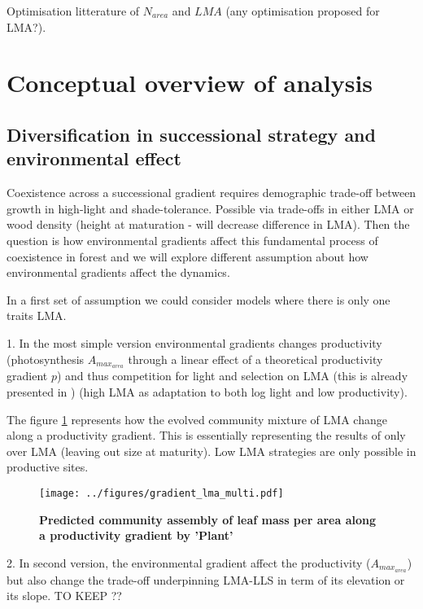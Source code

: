 \documentclass[a4paper,11pt]{article}
\begin{document}
Optimisation litterature of $N_{area}$ and $LMA$ (any optimisation proposed for LMA?).



\section{Conceptual overview of analysis}

\subsection{Diversification in successional strategy and environmental effect}

Coexistence across a successional gradient requires demographic trade-off between growth in high-light and shade-tolerance. Possible via trade-offs in either LMA or wood density (height at maturation - will decrease difference in LMA). Then the question is how environmental gradients affect this fundamental process of coexistence in forest and we will explore different assumption about how environmental gradients
affect the dynamics.

In a first set of assumption we could consider models where there is only one traits LMA.

\clearpage

1. In the most simple version environmental gradients changes productivity (photosynthesis $A_{max}_{area}$ through a linear effect of a theoretical productivity gradient $p$) and
thus competition for light and selection on LMA (this is already presented in \citet{Falster-2017}) (high LMA as adaptation to both log light and low productivity).

The figure \ref{fig:lma} represents how the evolved community mixture of LMA change along a productivity gradient. This is essentially representing the results of \citet{Falster-2017} only over LMA (leaving out size at maturity). Low LMA strategies are only possible in productive sites.

\begin{figure}[ht]
\centering
\texttt{[image: ../figures/gradient\_lma\_multi.pdf]}
\caption{\textbf{Predicted community assembly of leaf mass per area along a productivity gradient by 'Plant' \citep[see][]{Falster-2016}}
\label{fig:lma}}
\end{figure}

\clearpage

2. In second version, the environmental gradient affect the productivity ($A_{max}_{area}$) but also change the trade-off underpinning LMA-LLS in term of its elevation or its slope. TO KEEP ??
\end{document}
